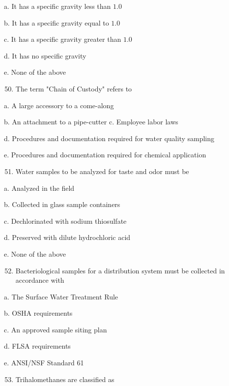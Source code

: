 \documentclass[10pt]{article}
\begin{document}
a. It has a specific gravity less than $1.0$

b. It has a specific gravity equal to $1.0$

c. It has a specific gravity greater than $1.0$

d. It has no specific gravity

e. None of the above

\begin{enumerate}
  \setcounter{enumi}{49}
  \item The term "Chain of Custody" refers to
\end{enumerate}

a. A large accessory to a come-along

b. An attachment to a pipe-cutter c. Employee labor laws

d. Procedures and documentation required for water quality sampling

e. Procedures and documentation required for chemical application

\begin{enumerate}
  \setcounter{enumi}{50}
  \item Water samples to be analyzed for taste and odor must be
\end{enumerate}

a. Analyzed in the field

b. Collected in glass sample containers

c. Dechlorinated with sodium thiosulfate

d. Preserved with dilute hydrochloric acid

e. None of the above

\begin{enumerate}
  \setcounter{enumi}{51}
  \item Bacteriological samples for a distribution system must be collected in accordance with
\end{enumerate}

a. The Surface Water Treatment Rule

b. OSHA requirements

c. An approved sample siting plan

d. FLSA requirements

e. ANSI/NSF Standard 61

\begin{enumerate}
  \setcounter{enumi}{52}
  \item Trihalomethanes are classified as
\end{enumerate}
\end{document}
